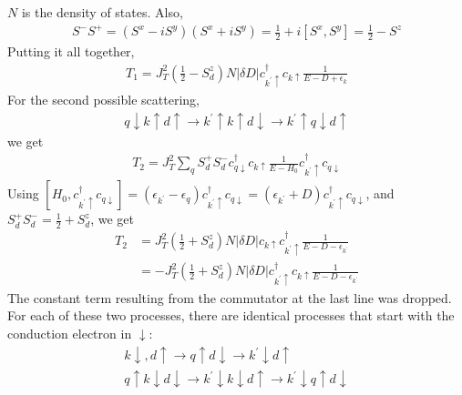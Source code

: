 \documentclass[twoside,11pt]{report}
\numberwithin{equation}{section}
\begin{document}
\(N\) is the density of states.
Also,
\begin{equation}\begin{aligned}
	S^- S^+= \left(S^x - iS^y\right)\left(S^x + iS^y\right) = \frac{1}{2} + i\left[S^x,S^y\right] = \frac{1}{2} - S^z
\end{aligned}\end{equation} 
Putting it all together, 
\begin{equation}\begin{aligned}
	T_1 = J_T^2\left(\frac{1}{2} - S_d^z\right)N|\delta D|c^\dagger_{k^\prime \uparrow}c_{k\uparrow}\frac{1}{E - D + \epsilon_k}
\end{aligned}\end{equation}
For the second possible scattering,
\begin{equation}\begin{aligned}
q \downarrow k \uparrow d\uparrow \rightarrow k^\prime \uparrow k \uparrow d\downarrow \rightarrow k^\prime\uparrow q \downarrow d\uparrow
\end{aligned}\end{equation}
we get
\begin{equation}\begin{aligned}
T_2 = J_T^2\sum_q S_d^+S_d^- c^\dagger_{q\downarrow}c_{k\uparrow}\frac{1}{E - H_0}c^\dagger_{k^\prime \uparrow}c_{q\downarrow}
\end{aligned}\end{equation}
Using \(\left[H_0, c^\dagger_{k^\prime \uparrow}c_{q\downarrow}\right] = \left(\epsilon_{k^\prime} - \epsilon_q\right) c^\dagger_{k^\prime \uparrow}c_{q\downarrow}= \left(\epsilon_{k^\prime} +D\right) c^\dagger_{k^\prime \uparrow}c_{q\downarrow}\), and \(S_d^+ S_d^- = \frac{1}{2}+S_d^z\), we get
\begin{equation}\begin{aligned}
	T_2 &= J_T^2 \left(\frac{1}{2}+S_d^z\right) N |\delta D|c_{k\uparrow}c^\dagger_{k^\prime \uparrow} \frac{1}{E - D - \epsilon_{k^\prime}} \\
	    &=-J_T^2 \left(\frac{1}{2}+S_d^z\right) N |\delta D|c^\dagger_{k^\prime \uparrow} c_{k\uparrow}\frac{1}{E - D - \epsilon_{k^\prime}}
\end{aligned}\end{equation}
The constant term resulting from the commutator at the last line was dropped.
For each of these two processes, there are identical processes that start with the conduction electron in \(\downarrow\):
\begin{gather}
k \downarrow, d\uparrow \rightarrow q \uparrow d \downarrow \rightarrow k^\prime \downarrow d\uparrow\\
q \uparrow k \downarrow d\downarrow \rightarrow k^\prime \downarrow k \downarrow d\uparrow \rightarrow k^\prime\downarrow q \uparrow d\downarrow
\end{gather}
\end{document}
